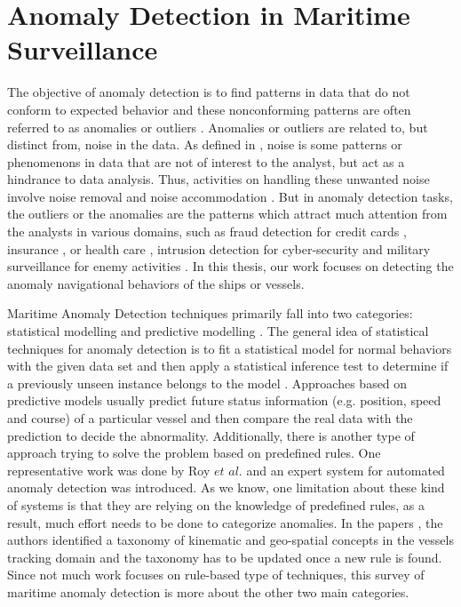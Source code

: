 \documentclass[12pt,glossary]{dalcsthesis}
\begin{document}
\section{Anomaly Detection in Maritime Surveillance}
\label{survey_anomaly_detection}

The objective of anomaly detection is to find patterns in data that do not conform to expected behavior and these nonconforming patterns are often referred to as anomalies or outliers \cite{chandola}. Anomalies or outliers are related to, but distinct from, noise in the data. As defined in \cite{chandola}, noise is some patterns or phenomenons in data that are not of interest to the analyst, but act as a hindrance to data analysis. Thus, activities on handling these unwanted noise involve noise removal \cite{teng1990adaptive} and noise accommodation \cite{rousseeuw2005}. But in anomaly detection tasks, the outliers or the anomalies are the patterns which attract much attention from the analysts in various domains, such as fraud detection for credit cards \cite{creditcard}, insurance \cite{insurance}, or health care \cite{healthcare}, intrusion detection
for cyber-security \cite{cyber} and military surveillance for enemy activities \cite{chandola}.  In this thesis, our work focuses on detecting the anomaly navigational behaviors  of the ships or vessels. 

Maritime Anomaly Detection techniques primarily fall into two categories: statistical modelling \cite{gmm}\cite{kde}\cite{Gerben} and predictive modelling \cite{PallottaFramework}\cite{bn_White}\cite{bn_Richard}. The general idea of  statistical techniques for anomaly detection is to fit a statistical model for normal behaviors with the given data set and then apply a statistical inference test to determine if a previously unseen instance belongs to the model \cite{chandola}. Approaches based on predictive models usually predict future status information (e.g. position, speed and course) of a particular vessel and then compare the real data with the prediction to decide the abnormality. Additionally, there is another type of approach trying to solve the problem based on predefined rules. One representative work was done by Roy $et$ $al$. \cite{roy2010rule}\cite{roy2009categorization} and an expert system for automated anomaly detection was introduced.  As we know, one limitation about these kind of systems is that they are  relying on the knowledge of predefined rules, as a result, much effort needs to be done to categorize anomalies. In the papers \cite{roy2010rule}\cite{roy2009categorization}, the authors identified a taxonomy of kinematic and geo-spatial concepts in the vessels tracking domain and the taxonomy has to be updated once a new rule is found.  Since not much work focuses on rule-based type of techniques, this survey of maritime anomaly detection is more about the other two main categories.
\end{document}
